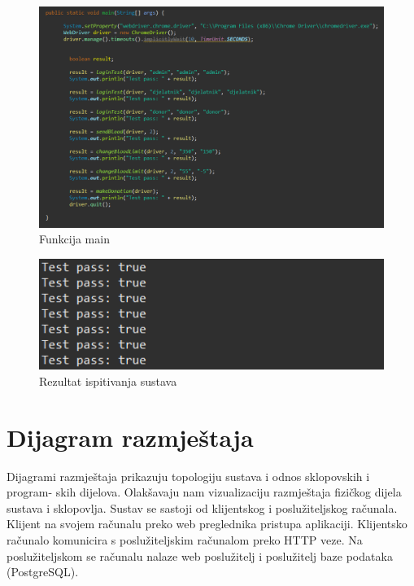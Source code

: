 \begin{figure}[H]
	\centering
	\includegraphics[width=\textwidth, scale=0.5]{slike/main}
	\caption{Funkcija main}
\end{figure}
\begin{figure}[H]
	\centering
	\includegraphics[width=\textwidth, scale=0.5]{slike/rezultat}
	\caption{Rezultat ispitivanja sustava}
\end{figure}
\eject
		\section{Dijagram razmještaja}
			
			Dijagrami razmještaja prikazuju topologiju sustava i odnos sklopovskih i program-
skih dijelova. Olakšavaju nam vizualizaciju razmještaja fizičkog dijela sustava i
sklopovlja. Sustav se sastoji od klijentskog i poslužiteljskog računala. Klijent na
svojem računalu preko web preglednika pristupa aplikaciji. Klijentsko računalo
komunicira s poslužiteljskim računalom preko HTTP veze. Na poslužiteljskom se
računalu nalaze web poslužitelj i poslužitelj baze podataka (PostgreSQL).


